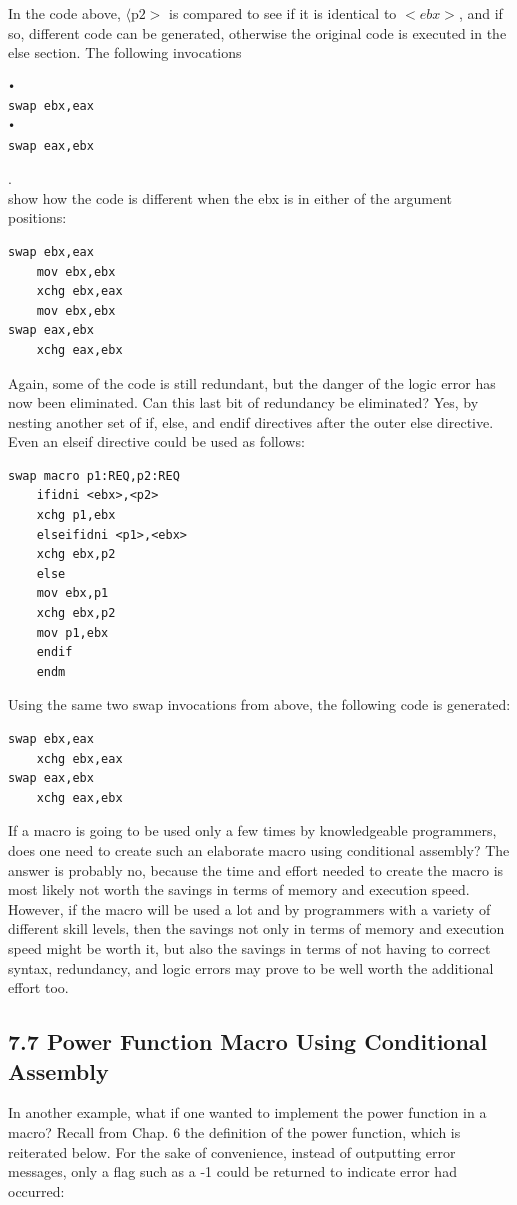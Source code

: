 \documentclass[10pt]{book}
\begin{document}
In the code above, $\langle\mathrm{p} 2>$ is compared to see if it is identical to $<e b x>$, and if so, different code can be generated, otherwise the original code is executed in the else section. The following invocations

\begin{verbatim}
•
swap ebx,eax
•
swap eax,ebx
\end{verbatim}

.\\
show how the code is different when the ebx is in either of the argument positions:

\begin{verbatim}
swap ebx,eax
    mov ebx,ebx
    xchg ebx,eax
    mov ebx,ebx
swap eax,ebx
    xchg eax,ebx
\end{verbatim}

Again, some of the code is still redundant, but the danger of the logic error has now been eliminated. Can this last bit of redundancy be eliminated? Yes, by nesting another set of if, else, and endif directives after the outer else directive. Even an elseif directive could be used as follows:

\begin{verbatim}
swap macro p1:REQ,p2:REQ
    ifidni <ebx>,<p2>
    xchg p1,ebx
    elseifidni <p1>,<ebx>
    xchg ebx,p2
    else
    mov ebx,p1
    xchg ebx,p2
    mov p1,ebx
    endif
    endm
\end{verbatim}

Using the same two swap invocations from above, the following code is generated:

\begin{verbatim}
swap ebx,eax
    xchg ebx,eax
swap eax,ebx
    xchg eax,ebx
\end{verbatim}

If a macro is going to be used only a few times by knowledgeable programmers, does one need to create such an elaborate macro using conditional assembly? The answer is probably no, because the time and effort needed to create the macro is most likely not worth the savings in terms of memory and execution speed. However, if the macro will be used a lot and by programmers with a variety of different skill levels, then the savings not only in terms of memory and execution speed might be worth it, but also the savings in terms of not having to correct syntax, redundancy, and logic errors may prove to be well worth the additional effort too.

\subsection*{7.7 Power Function Macro Using Conditional Assembly}
In another example, what if one wanted to implement the power function in a macro? Recall from Chap. 6 the definition of the power function, which is reiterated below. For the sake of convenience, instead of outputting error messages, only a flag such as a -1 could be returned to indicate error had occurred:
\end{document}
